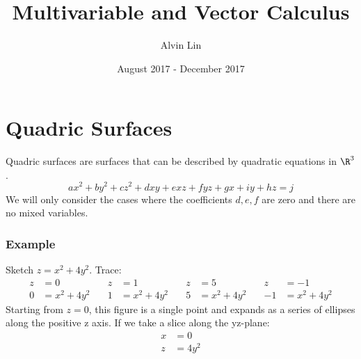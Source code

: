 \documentclass{math}
\title{Multivariable and Vector Calculus}
\author{Alvin Lin}
\date{August 2017 - December 2017}
\begin{document}
\maketitle

\section*{Quadric Surfaces}
Quadric surfaces are surfaces that can be described by quadratic equations in
\( \R^3 \).
\[ ax^2+by^2+cz^2+dxy+exz+fyz+gx+iy+hz = j \]
We will only consider the cases where the coefficients \( d,e,f \) are zero
and there are no mixed variables.

\subsubsection*{Example}
Sketch \( z = x^2+4y^2 \). Trace:
\[\begin{split}
  z &= 0 \\
  0 &= x^2+4y^2
\end{split}
\quad
\begin{split}
  z &= 1 \\
  1 &= x^2+4y^2
\end{split}
\quad
\begin{split}
  z &= 5 \\
  5 &= x^2+4y^2
\end{split}
\quad
\begin{split}
  z &= -1 \\
  -1 &= x^2+4y^2
\end{split} \]
Starting from \( z = 0 \), this figure is a single point and expands as a series
of ellipses along the positive z axis. If we take a slice along the yz-plane:
\begin{align*}
  x &= 0 \\
  z &= 4y^2
\end{align*}
\begin{center}
\end{center}
\end{document}
